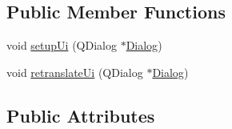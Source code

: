 \subsection*{Public Member Functions}
\begin{DoxyCompactItemize}
\item 
void \hyperlink{class_ui___dialog_a4f6a478c3ecdafabffb17b39cb26444a}{setup\+Ui} (Q\+Dialog $\ast$\hyperlink{class_dialog}{Dialog})
\item 
void \hyperlink{class_ui___dialog_afa0ccb6f716ca6178260522a193c250e}{retranslate\+Ui} (Q\+Dialog $\ast$\hyperlink{class_dialog}{Dialog})
\end{DoxyCompactItemize}
\subsection*{Public Attributes}
